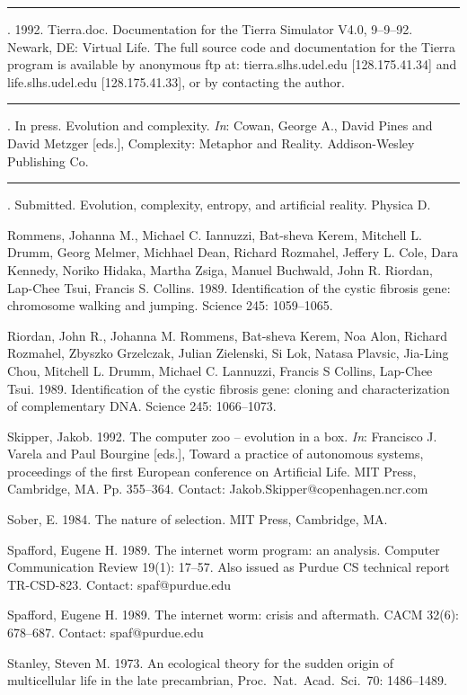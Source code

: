 \begin{thebibliography}{99}
\rule[0pt]{3em}{.4pt}.  1992.  Tierra.doc.  Documentation for the
Tierra Simulator V4.0, 9--9--92.  Newark, DE: Virtual Life.
The full source code and documentation for the Tierra program is
available by anonymous ftp at: tierra.slhs.udel.edu [128.175.41.34] and
life.slhs.udel.edu [128.175.41.33], or by contacting the author.

\rule[0pt]{3em}{.4pt}.  In press.  Evolution and complexity.  {\it In}:
Cowan, George A., David Pines and David Metzger [eds.],
Complexity: Metaphor and Reality.  Addison-Wesley Publishing Co.

\rule[0pt]{3em}{.4pt}.  Submitted.  Evolution, complexity, entropy,
and artificial reality.  Physica D.

Rommens, Johanna M., Michael C. Iannuzzi, Bat-sheva Kerem, Mitchell L. Drumm,
Georg Melmer, Michhael Dean, Richard Rozmahel, Jeffery L. Cole, Dara Kennedy,
Noriko Hidaka, Martha Zsiga, Manuel Buchwald, John R. Riordan, Lap-Chee Tsui,
Francis S. Collins.  1989.  Identification of the cystic fibrosis gene:
chromosome walking and jumping.  Science 245: 1059--1065.

Riordan, John R., Johanna M. Rommens, Bat-sheva Kerem, Noa Alon, Richard
Rozmahel, Zbyszko Grzelczak, Julian Zielenski, Si Lok, Natasa Plavsic,
Jia-Ling Chou, Mitchell L. Drumm, Michael C. Lannuzzi, Francis S Collins,
Lap-Chee Tsui.  1989.  Identification of the cystic fibrosis gene: cloning
and characterization of complementary DNA.  Science 245: 1066--1073.

Skipper, Jakob.  1992.  The computer zoo -- evolution in a box.  {\em In}:
Francisco J. Varela and Paul Bourgine [eds.], Toward a practice of
autonomous systems, proceedings of the first European conference on
Artificial Life.  MIT Press, Cambridge, MA.  Pp. 355--364.
Contact: Jakob.Skipper@copenhagen.ncr.com

Sober, E.  1984.  The nature of selection.  MIT Press, Cambridge, MA.

Spafford, Eugene H.  1989.  The internet worm program: an analysis.
Computer Communication Review 19(1): 17--57.  Also issued as Purdue
CS technical report TR-CSD-823.  Contact: spaf@purdue.edu

Spafford, Eugene H.  1989.  The internet worm: crisis and aftermath.
CACM 32(6): 678--687.  Contact: spaf@purdue.edu

Stanley, Steven M.  1973.  An ecological theory for the sudden origin
of multicellular life in the late precambrian, Proc.\ Nat.\ Acad.\ Sci.\ 70:
1486--1489.


\end{thebibliography}
